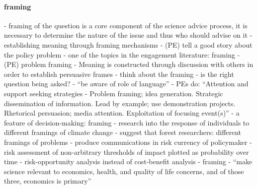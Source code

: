 \paragraph{framing}
\cite[p18]{OECD2015} - framing of the question is a core component of the science advice process, it is necessary to determine the nature of the issue and thus who should advise on it
\cite{AukesLB2018} - establishing meaning through framing mechanisms
\cite{Cairney2018} - (PE) tell a good story about the policy problem
\cite{CairneyO2020} - one of the topics in the engagement literature: framing
\cite{Mintrom2019} - (PE) problem framing - Meaning is constructed through discussion with others in order to establish persuasive frames
\cite{GluckmanBK2021} - think about the framing - is the right question being asked?
\cite{ElsensohnACDGGKPRS2019} - ``be aware of role of language''
\cite{vonMalmborg2024strategies} - PEs do: ``Attention and support seeking strategies - Problem framing; idea generation. Strategic dissemination of information. Lead by example; use demonstration projects. Rhetorical persuasion; media attention. Exploitation of focusing event(s)''
\cite{MoallemiZHSMZHKHMGLB2023} - a feature of decision-making: framing
\cite{NabiGJ2018} - research into the response of individuals to different framings of climate change
\cite{OjanenBKP2021} - suggest that forest researchers: different framings of problems
\cite{DeMeyer2019} - produce communications in risk currency of policymaker
\cite{Sharpe2019} - risk assessment of non-arbitrary thresholds of impact plotted as probability over time
\cite{SharpeMVIGPKN2021} - risk-opportunity analysis instead of cost-benefit analysis
\cite{ThompsonD2024} - framing
\cite{RykielEtAl2002} - ``make science relevant to economics, health, and quality of life concerns, and of those three, economics is primary''
